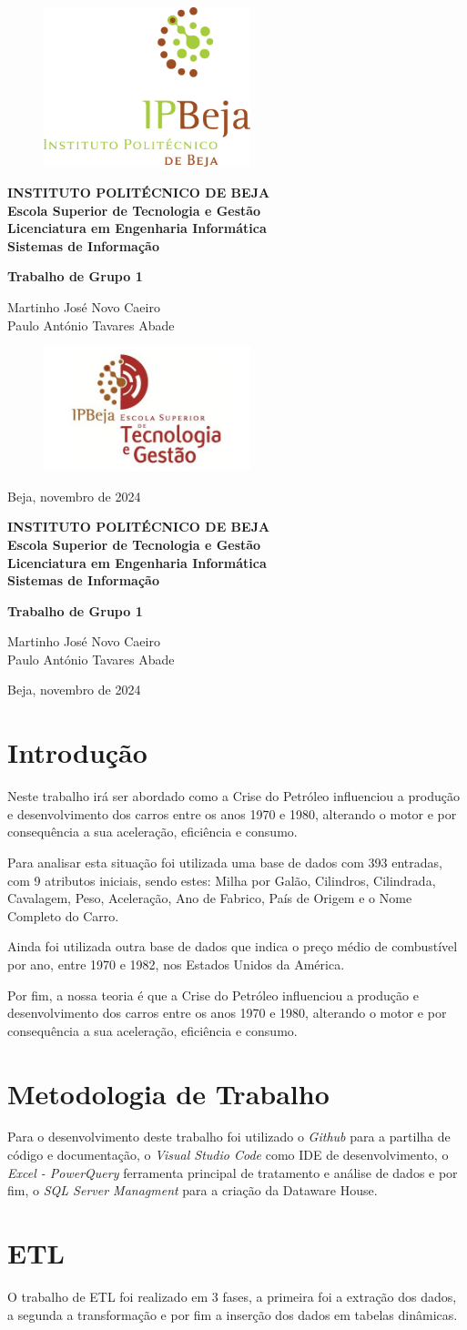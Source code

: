 \documentclass[a4paper]{article}
\newcommand{\firsttitlepage}{
    \begin{titlepage}
        \centering
        \vspace*{1cm}
        
        \begin{figure}[h!]
            \centering
            \includegraphics[width=6cm]{Recursos/LOGO_IPB} %
            \vspace{0.5cm}
        \end{figure}

        \large\textbf{INSTITUTO POLITÉCNICO DE BEJA} \\
        \large\textbf{Escola Superior de Tecnologia e Gestão} \\
        \large\textbf{Licenciatura em Engenharia Informática} \\
        \large\textbf{Sistemas de Informação} \\
        
        \vspace{2cm}
        
        {\Huge \textbf{Trabalho de Grupo 1}} \\
        
        \vspace{1.5cm}
        
        \large Martinho José Novo Caeiro \\
        \large Paulo António Tavares Abade \\
        
        \vfill
        
        \begin{figure}[h!]
            \centering
            \includegraphics[width=6cm]{Recursos/IPBejaESTIG.jpg} %
        \end{figure}
        
        \vspace{1cm}
        
        {\large Beja, novembro de 2024}
    \end{titlepage}
}
\newcommand{\secondtitlepage}{
    \begin{titlepage}
        \centering
        \vspace*{1cm}
        
        \large\textbf{INSTITUTO POLITÉCNICO DE BEJA} \\
        \large\textbf{Escola Superior de Tecnologia e Gestão} \\
        \large\textbf{Licenciatura em Engenharia Informática} \\
        \large\textbf{Sistemas de Informação} \\
        
        \vspace{2cm}
        
        {\Huge \textbf{Trabalho de Grupo 1}} \\
        
        \vspace{1.5cm}
        
        \large Martinho José Novo Caeiro \\
        \large Paulo António Tavares Abade \\
        
        \vfill
        
        {\large Beja, novembro de 2024}
    \end{titlepage}
}
\begin{document}

\firsttitlepage

\secondtitlepage

\newpage
\doublespacing
\tableofcontents
\doublespacing

\newpage
{}

\section{Introdução}\label{intro}
Neste trabalho irá ser abordado como a Crise do Petróleo influenciou a produção e desenvolvimento
dos carros entre os anos 1970 e 1980, alterando o motor e por consequência a sua aceleração, eficiência e consumo.

Para analisar esta situação foi utilizada uma base de dados com 393 entradas, com 9 atributos iniciais, sendo estes:
 Milha por Galão, Cilindros, Cilindrada, Cavalagem, Peso, Aceleração, Ano de Fabrico, País de Origem e o Nome Completo do Carro.

Ainda foi utilizada outra base de dados que indica o preço médio de combustível por ano, entre 1970 e 1982, 
nos Estados Unidos da América.

Por fim, a nossa teoria é que a Crise do Petróleo influenciou a produção e 
desenvolvimento dos carros entre os anos 1970 e 1980, alterando o motor e por consequência a sua aceleração, eficiência e consumo.
\section{Metodologia de Trabalho}\label{met}
Para o desenvolvimento deste trabalho foi utilizado o \textit{Github} para a partilha de código e documentação,
o \textit{Visual Studio Code} como IDE de desenvolvimento, o \textit{Excel - PowerQuery} ferramenta principal de tratamento
e análise de dados e por fim, o \textit{SQL Server Managment} para a criação da Dataware House. 
\section{ETL}\label{etl}
O trabalho de ETL foi realizado em 3 fases, a primeira foi a extração dos dados, 
a segunda a transformação e por fim a inserção dos dados em tabelas dinâmicas.
\end{document}
